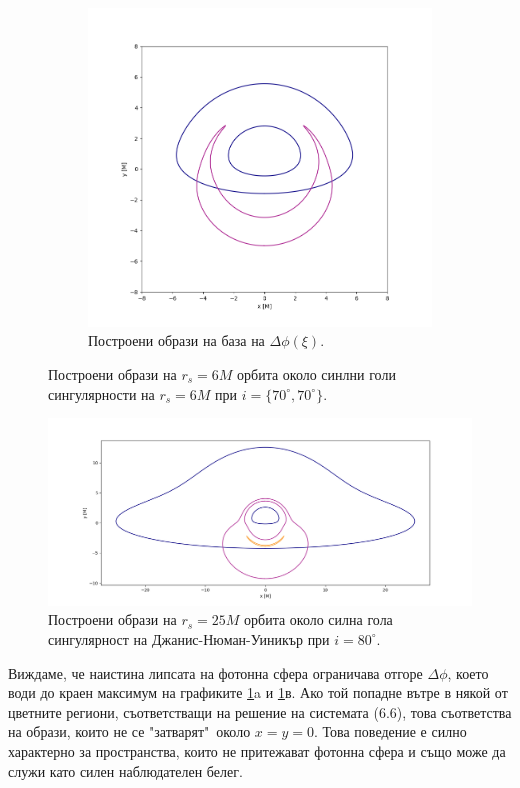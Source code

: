 \begin{figure}[!htb]
\begin{subfigure}{6cm}
		\includegraphics[scale = 0.3]{JNW_70_deg_r6_gamma_0.48.png}
		\caption{Построени образи на база на  $\Delta\phi(\xi)$.} 
	\end{subfigure}
	\caption[Построени образи на $r_s = 6M$ орбита около синлни голи сингулярности.]{\small Построени образи на $r_s = 6M$ орбита около синлни голи сингулярности на $r_s = 6M$ при $i = \{70^\circ, 70^\circ\}$.} 
	\label{GB_JNW_r6}
\end{figure}
\begin{figure}
	\centering
	\includegraphics[scale = 0.35]{GB_70_deg_r25_gamma_0.48.png}
	\caption[Построени образи на $r_s = 25M$ орбита около синлни гола сингулярност на Джанис-Нюман-Уиникър.]{\small Построени образи на $r_s = 25M$ орбита около силна гола сингулярност на Джанис-Нюман-Уиникър при $i = 80^\circ$.} 
	\label{JNW_r25}
\end{figure}
Виждаме, че наистина липсата на фотонна сфера ограничава отгоре $\Delta\phi$, което води до краен максимум на графиките \ref{GB_JNW_r6}a и \ref{GB_JNW_r6}в. Ако той попадне вътре в някой от цветните региони, съответстващи на решение на системата (6.6), това съответства на образи, които не се "затварят"$\,$ около $x = y = 0$. Това поведение е силно характерно за пространства, които не притежават фотонна сфера и също може да служи като силен наблюдателен белег.
\newpage
